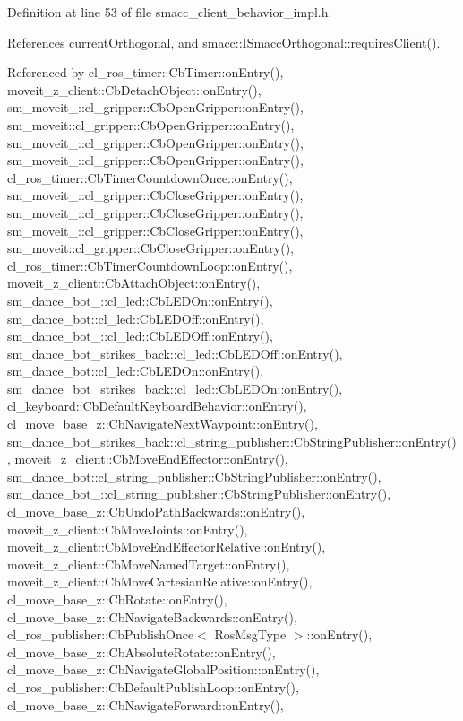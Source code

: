 Definition at line 53 of file smacc\+\_\+client\+\_\+behavior\+\_\+impl.\+h.



References current\+Orthogonal, and smacc\+::\+I\+Smacc\+Orthogonal\+::requires\+Client().



Referenced by cl\+\_\+ros\+\_\+timer\+::\+Cb\+Timer\+::on\+Entry(), moveit\+\_\+z\+\_\+client\+::\+Cb\+Detach\+Object\+::on\+Entry(), sm\+\_\+moveit\+\_\+::cl\+\_\+gripper\+::\+Cb\+Open\+Gripper\+::on\+Entry(), sm\+\_\+moveit\+::cl\+\_\+gripper\+::\+Cb\+Open\+Gripper\+::on\+Entry(), sm\+\_\+moveit\+\_\+::cl\+\_\+gripper\+::\+Cb\+Open\+Gripper\+::on\+Entry(), sm\+\_\+moveit\+\_\+::cl\+\_\+gripper\+::\+Cb\+Open\+Gripper\+::on\+Entry(), cl\+\_\+ros\+\_\+timer\+::\+Cb\+Timer\+Countdown\+Once\+::on\+Entry(), sm\+\_\+moveit\+\_\+::cl\+\_\+gripper\+::\+Cb\+Close\+Gripper\+::on\+Entry(), sm\+\_\+moveit\+\_\+::cl\+\_\+gripper\+::\+Cb\+Close\+Gripper\+::on\+Entry(), sm\+\_\+moveit\+\_\+::cl\+\_\+gripper\+::\+Cb\+Close\+Gripper\+::on\+Entry(), sm\+\_\+moveit\+::cl\+\_\+gripper\+::\+Cb\+Close\+Gripper\+::on\+Entry(), cl\+\_\+ros\+\_\+timer\+::\+Cb\+Timer\+Countdown\+Loop\+::on\+Entry(), moveit\+\_\+z\+\_\+client\+::\+Cb\+Attach\+Object\+::on\+Entry(), sm\+\_\+dance\+\_\+bot\+\_\+::cl\+\_\+led\+::\+Cb\+L\+E\+D\+On\+::on\+Entry(), sm\+\_\+dance\+\_\+bot\+::cl\+\_\+led\+::\+Cb\+L\+E\+D\+Off\+::on\+Entry(), sm\+\_\+dance\+\_\+bot\+\_\+::cl\+\_\+led\+::\+Cb\+L\+E\+D\+Off\+::on\+Entry(), sm\+\_\+dance\+\_\+bot\+\_\+strikes\+\_\+back\+::cl\+\_\+led\+::\+Cb\+L\+E\+D\+Off\+::on\+Entry(), sm\+\_\+dance\+\_\+bot\+::cl\+\_\+led\+::\+Cb\+L\+E\+D\+On\+::on\+Entry(), sm\+\_\+dance\+\_\+bot\+\_\+strikes\+\_\+back\+::cl\+\_\+led\+::\+Cb\+L\+E\+D\+On\+::on\+Entry(), cl\+\_\+keyboard\+::\+Cb\+Default\+Keyboard\+Behavior\+::on\+Entry(), cl\+\_\+move\+\_\+base\+\_\+z\+::\+Cb\+Navigate\+Next\+Waypoint\+::on\+Entry(), sm\+\_\+dance\+\_\+bot\+\_\+strikes\+\_\+back\+::cl\+\_\+string\+\_\+publisher\+::\+Cb\+String\+Publisher\+::on\+Entry(), moveit\+\_\+z\+\_\+client\+::\+Cb\+Move\+End\+Effector\+::on\+Entry(), sm\+\_\+dance\+\_\+bot\+::cl\+\_\+string\+\_\+publisher\+::\+Cb\+String\+Publisher\+::on\+Entry(), sm\+\_\+dance\+\_\+bot\+\_\+::cl\+\_\+string\+\_\+publisher\+::\+Cb\+String\+Publisher\+::on\+Entry(), cl\+\_\+move\+\_\+base\+\_\+z\+::\+Cb\+Undo\+Path\+Backwards\+::on\+Entry(), moveit\+\_\+z\+\_\+client\+::\+Cb\+Move\+Joints\+::on\+Entry(), moveit\+\_\+z\+\_\+client\+::\+Cb\+Move\+End\+Effector\+Relative\+::on\+Entry(), moveit\+\_\+z\+\_\+client\+::\+Cb\+Move\+Named\+Target\+::on\+Entry(), moveit\+\_\+z\+\_\+client\+::\+Cb\+Move\+Cartesian\+Relative\+::on\+Entry(), cl\+\_\+move\+\_\+base\+\_\+z\+::\+Cb\+Rotate\+::on\+Entry(), cl\+\_\+move\+\_\+base\+\_\+z\+::\+Cb\+Navigate\+Backwards\+::on\+Entry(), cl\+\_\+ros\+\_\+publisher\+::\+Cb\+Publish\+Once$<$ Ros\+Msg\+Type $>$\+::on\+Entry(), cl\+\_\+move\+\_\+base\+\_\+z\+::\+Cb\+Absolute\+Rotate\+::on\+Entry(), cl\+\_\+move\+\_\+base\+\_\+z\+::\+Cb\+Navigate\+Global\+Position\+::on\+Entry(), cl\+\_\+ros\+\_\+publisher\+::\+Cb\+Default\+Publish\+Loop\+::on\+Entry(), cl\+\_\+move\+\_\+base\+\_\+z\+::\+Cb\+Navigate\+Forward\+::on\+Entry(), 